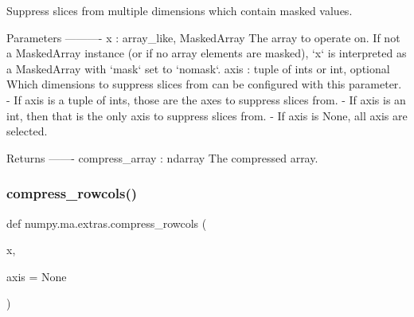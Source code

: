 \begin{DoxyVerb}Suppress slices from multiple dimensions which contain masked values.

Parameters
----------
x : array_like, MaskedArray
    The array to operate on. If not a MaskedArray instance (or if no array
    elements are masked), `x` is interpreted as a MaskedArray with `mask`
    set to `nomask`.
axis : tuple of ints or int, optional
    Which dimensions to suppress slices from can be configured with this
    parameter.
    - If axis is a tuple of ints, those are the axes to suppress slices from.
    - If axis is an int, then that is the only axis to suppress slices from.
    - If axis is None, all axis are selected.

Returns
-------
compress_array : ndarray
    The compressed array.
\end{DoxyVerb}
 \mbox{\label{namespacenumpy_1_1ma_1_1extras_a3e2b6486aefeb320bba95ad627d677dc}} 
\subsubsection{\texorpdfstring{compress\+\_\+rowcols()}{compress\_rowcols()}}
{\footnotesize\ttfamily def numpy.\+ma.\+extras.\+compress\+\_\+rowcols (\begin{DoxyParamCaption}\item[{}]{x,  }\item[{}]{axis = {\ttfamily None} }\end{DoxyParamCaption})}

